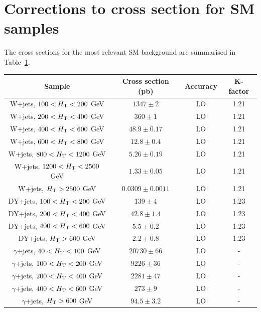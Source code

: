 \section{Corrections to cross section for SM samples}
\label{sec:sideband_corrections}
The cross sections for the most relevant SM background are summarised in Table~\ref{tab:cross_sections_bkg}.

\begin{table}[!h]
  \scriptsize
  \centering
  \label{tab:cross_sections_bkg}
  \begin{tabular}
    {c|c|c|c}
    \hline\hline
    \textbf{Sample} & \textbf{Cross section (pb)} & \textbf{Accuracy} & \textbf{K-factor} \\
    \hline
    W+jets, $100 < \scalht < 200$ GeV & $1347 \pm 2$ & LO & 1.21 \\
    W+jets, $200 < \scalht < 400$ GeV & $360 \pm 1$ & LO & 1.21 \\
    W+jets, $400 < \scalht < 600$ GeV & $48.9 \pm 0.17$ & LO & 1.21 \\
    W+jets, $600 < \scalht < 800$ GeV & $12.8 \pm 0.4$ & LO & 1.21 \\
    W+jets, $800 < \scalht < 1200$ GeV & $5.26 \pm 0.19$ & LO & 1.21 \\
    W+jets, $1200 < \scalht < 2500$ GeV & $1.33 \pm 0.05$ & LO & 1.21 \\
    W+jets, $\scalht > 2500$ GeV & $0.0309 \pm 0.0011$ & LO & 1.21 \\
    \hline
    DY+jets, $100 < \scalht < 200$ GeV & $139 \pm 4$ & LO & 1.23 \\
    DY+jets, $200 < \scalht < 400$ GeV & $42.8 \pm 1.4$ & LO & 1.23 \\
    DY+jets, $400 < \scalht < 600$ GeV & $5.5 \pm 0.2$ & LO & 1.23 \\
    DY+jets, $\scalht > 600$ GeV & $2.2 \pm 0.8$ & LO & 1.23 \\
    \hline
    $\gamma$+jets, $40 < \scalht < 100$ GeV & $20730 \pm 66$ & LO & - \\
    $\gamma$+jets, $100 < \scalht < 200$ GeV & $9226 \pm 36$ & LO & - \\
    $\gamma$+jets, $200 < \scalht < 400$ GeV & $2281 \pm 47$ & LO & - \\
    $\gamma$+jets, $400 < \scalht < 600$ GeV & $273 \pm 9$ & LO & - \\
    $\gamma$+jets, $\scalht > 600$ GeV & $94.5 \pm 3.2$ & LO & - \\

\end{tabular}
\end{table}
